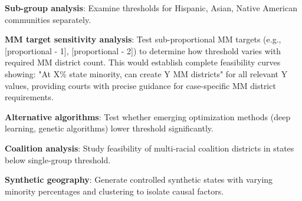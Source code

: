 \textbf{Sub-group analysis}: Examine thresholds for Hispanic, Asian, Native American communities separately.

\textbf{MM target sensitivity analysis}: Test sub-proportional MM targets (e.g., [proportional - 1], [proportional - 2]) to determine how threshold varies with required MM district count. This would establish complete feasibility curves showing: "At X\% state minority, can create Y MM districts" for all relevant Y values, providing courts with precise guidance for case-specific MM district requirements.

\textbf{Alternative algorithms}: Test whether emerging optimization methods (deep learning, genetic algorithms) lower threshold significantly.

\textbf{Coalition analysis}: Study feasibility of multi-racial coalition districts in states below single-group threshold.

\textbf{Synthetic geography}: Generate controlled synthetic states with varying minority percentages and clustering to isolate causal factors.
